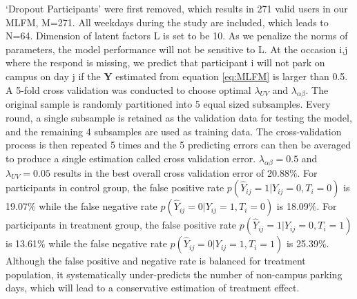 \documentclass[preprint,12pt]{elsarticle}
\begin{document}
`Dropout Participants' were first removed, which results in 271 valid users in our MLFM, M=271. All weekdays during the study are included, which leads to N=64. Dimension of latent factors L is set to be 10. As we penalize the norms of parameters, the model performance will not be sensitive to L.   At the occasion {i,j} where the respond is missing, we predict that participant i will not park on campus on day j if the $\mathbf{Y}$ estimated from equation \ref{eq:MLFM} is larger than 0.5. A 5-fold cross validation was conducted to choose optimal $\lambda_{UV}$ and $\lambda_{\alpha \beta}$. The original sample is randomly partitioned into 5 equal sized subsamples. Every round, a single subsample is retained as the validation data for testing the model, and the remaining 4 subsamples are used as training data. The cross-validation process is then repeated 5 times and the 5 predicting errors can then be averaged to produce a single estimation called cross validation error. $\lambda_{\alpha \beta}=0.5$  and $\lambda_{UV}=0.05$ results in the best overall cross validation error of 20.88$\%$. For participants in control group, the false positive rate $p({{\hat Y}_{ij}} = 1|{Y_{ij}} = 0,T_i=0)$ is 19.07$\%$ while the false negative rate $p({{\hat Y}_{ij}} = 0|{Y_{ij}} = 1,T_i=0)$ is 18.09$\%$. For participants in treatment group, the false positive rate $p({{\hat Y}_{ij}} = 1|{Y_{ij}} = 0,T_i=1)$ is 13.61$\%$ while the false negative rate $p({{\hat Y}_{ij}} = 0|{Y_{ij}} = 1,T_i=1)$ is 25.39$\%$. Although the false positive and negative rate is balanced for treatment population, it systematically under-predicts the number of non-campus parking days, which will lead to a conservative estimation of treatment effect. \\
\end{document}
